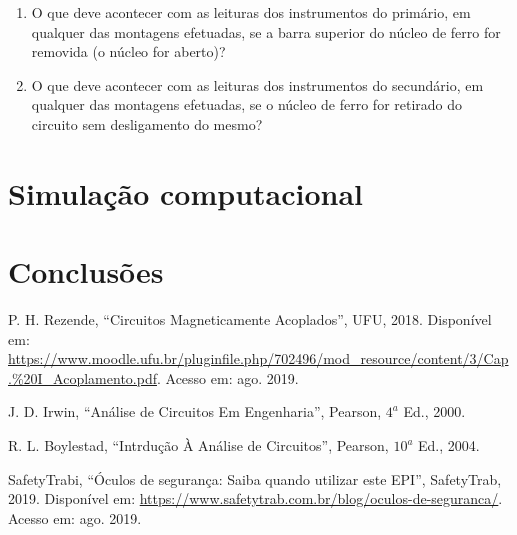 \documentclass[a4paper,12pt,oneside,openany,table,xcdraw]{article}
\begin{document}
\begin{enumerate}[1 - ]
\item O que deve acontecer com as leituras dos instrumentos do primário, em qualquer das
montagens efetuadas, se a barra superior do núcleo de ferro for removida (o núcleo for
aberto)? \\

\item O que deve acontecer com as leituras dos instrumentos do secundário, em qualquer das
montagens efetuadas, se o núcleo de ferro for retirado do circuito sem desligamento do
mesmo? \\


\end{enumerate}


\section{Simulação computacional} %

\section{Conclusões} %


\newpage
\begin{thebibliography}{9} 
    P. H. Rezende,
    “Circuitos Magneticamente Acoplados”, UFU, 2018.
 Disponível em:
 \url{https://www.moodle.ufu.br/pluginfile.php/702496/mod_resource/content/3/Cap.\%20I_Acoplamento.pdf}. Acesso em: ago. 2019.

    J. D. Irwin,
    “Análise de Circuitos Em Engenharia”, Pearson, $4^a$ Ed., 2000.

    R. L. Boylestad,
    “Intrdução À Análise de Circuitos”, Pearson, $10^a$ Ed., 2004.


    SafetyTrabi,
    “Óculos de segurança: Saiba quando utilizar este EPI”, SafetyTrab, 2019.
 Disponível em:
 \url{https://www.safetytrab.com.br/blog/oculos-de-seguranca/}. Acesso em: ago. 2019.




\end{thebibliography}
\end{document}
